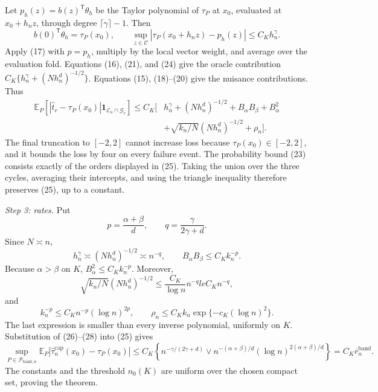 Let \(p_h(z)=b(z)^{\mathsf T}\theta_h\) be the Taylor polynomial of \(\tau_P\) at \(x_0\), evaluated at \(x_0+h_nz\), through degree \(\lceil\gamma\rceil-1\).  Then
\[
b(0)^{\mathsf T}\theta_h=\tau_P(x_0),
\qquad
\sup_{z\in\mathcal C}|\tau_P(x_0+h_nz)-p_h(z)|
\le C_Kh_n^\gamma.
\tag{24}
\]
Apply (17) with \(p=p_h\), multiply by the local vector weight, and average over the evaluation fold.  Equations (16), (21), and (24) give the oracle contribution \(C_K\{h_n^\gamma+(Nh_n^d)^{-1/2}\}\).  Equations (15), (18)--(20) give the nuisance contributions.  Thus
\[
\begin{aligned}
\mathbb E_P\!\left[
|\widehat t_r-\tau_P(x_0)|
\mathbf 1_{\mathcal E_n\cap\mathcal G_r}\right]
\le C_K\big[&h_n^\gamma+(Nh_n^d)^{-1/2}
+B_\alpha B_\beta+B_\alpha^2\\
&+\sqrt{k_n/N}(Nh_n^d)^{-1/2}+\rho_n\big].
\end{aligned}
\tag{25}
\]
The final truncation to \([-2,2]\) cannot increase loss because \(\tau_P(x_0)\in[-2,2]\), and it bounds the loss by four on every failure event.  The probability bound (23) consists exactly of the orders displayed in (25).  Taking the union over the three cycles, averaging their intercepts, and using the triangle inequality therefore preserves (25), up to a constant.

\emph{Step 3: rates.}
Put
\[
p=\frac{\alpha+\beta}{d},
\qquad q=\frac{\gamma}{2\gamma+d}.
\]
Since \(N\asymp n\),
\[
h_n^\gamma\asymp(Nh_n^d)^{-1/2}\asymp n^{-q},
\qquad
B_\alpha B_\beta\le C_Kk_n^{-p}.
\tag{26}
\]
Because \(\alpha>\beta\) on \(K\), \(B_\alpha^2\le C_Kk_n^{-p}\).  Moreover,
\[
\sqrt{k_n/N}(Nh_n^d)^{-1/2}
\le \frac{C_K}{\log n}n^{-q}le C_Kn^{-q},
\tag{27}
\]
and
\[
k_n^{-p}\le C_Kn^{-p}(\log n)^{2p},
\qquad
\rho_n\le C_Kk_n\exp\{-c_K(\log n)^2\}.
\tag{28}
\]
The last expression is smaller than every inverse polynomial, uniformly on \(K\).  Substitution of (26)--(28) into (25) gives
\[
\sup_{P\in\mathcal P_{\mathrm{band},n}}
\mathbb E_P\left|
\widehat\tau_n^{\mathrm{cap}}(x_0)-\tau_P(x_0)
\right|
\le C_K\left\{n^{-\gamma/(2\gamma+d)}
\vee n^{-(\alpha+\beta)/d}(\log n)^{2(\alpha+\beta)/d}\right\}
=C_K\overline r_n^{\mathrm{band}}.
\]
The constants and the threshold \(n_0(K)\) are uniform over the chosen compact set, proving the theorem.